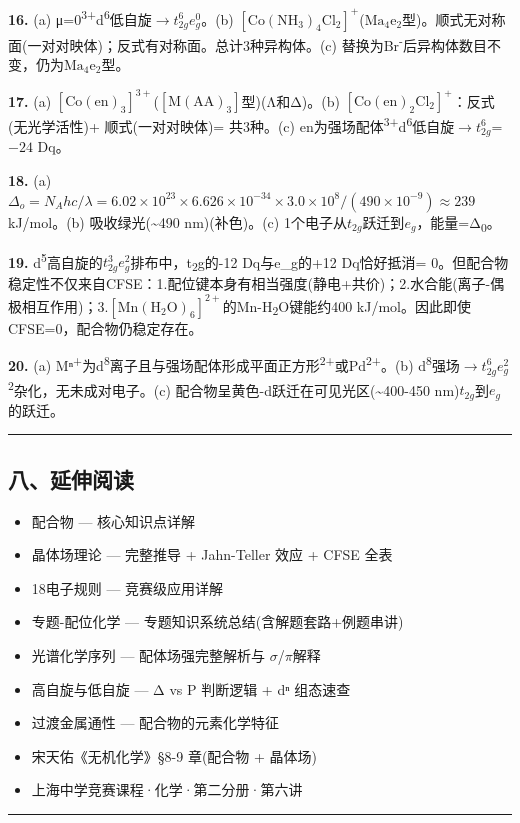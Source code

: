 \documentclass[a4paper,11pt]{ctexart}
\providecommand{\tightlist}{\setlength{\itemsep}{0pt}\setlength{\parskip}{0pt}}
\newcommand{\箭}{\ensuremath{\rightarrow}}
\newcommand{\左箭}{\ensuremath{\leftarrow}}
\newcommand{\上箭}{\ensuremath{\uparrow}}
\newcommand{\下箭}{\ensuremath{\downarrow}}
\newcommand{\衡}{\ensuremath{\rightleftharpoons}}
\newcommand{\双箭}{\ensuremath{\leftrightarrow}}
\newcommand{\约等于}{\ensuremath{\approx}}
\newcommand{\小于等于}{\ensuremath{\leq}}
\newcommand{\大于等于}{\ensuremath{\geq}}
\newcommand{\不等于}{\ensuremath{\neq}}
\newcommand{\西格马}{\ensuremath{\sigma}}
\newcommand{\派}{\ensuremath{\pi}}
\begin{document}
\textbf{16.} (a) μ=0\textsuperscript{3+}d\textsuperscript{6}低自旋\箭\(t_{2g}^6 e_g^0\)。(b) \(\mathrm{[Co(NH_3)_4Cl_2]^+}\)(\(\mathrm{Ma_4e_2}\)型)。顺式无对称面(一对对映体)；反式有对称面。总计3种异构体。(c) 替换为Br\textsuperscript{-}后异构体数目不变，仍为\(\mathrm{Ma_4e_2}\)型。

\textbf{17.} (a) \(\mathrm{[Co(en)_3]^{3+}}\)(\(\mathrm{[M(AA)_3]}\)型)(Λ和Δ)。(b) \(\mathrm{[Co(en)_2Cl_2]^+}\)：反式(无光学活性)+ 顺式(一对对映体)= 共3种。(c) en为强场配体\textsuperscript{3+}d\textsuperscript{6}低自旋\箭\(t_{2g}^6\) = \(-24\) Dq。

\textbf{18.} (a) \(\Delta_o = N_A hc/\lambda = 6.02 \times 10^{23} \times 6.626 \times 10^{-34} \times 3.0 \times 10^8 / (490 \times 10^{-9}) \approx 239\) kJ/mol。(b) 吸收绿光(\textasciitilde490 nm)(补色)。(c) 1个电子从\(t_{2g}\)跃迁到\(e_g\)，能量=Δ\textsubscript{0}。

\textbf{19.} d\textsuperscript{5}高自旋的\(t_{2g}^3 e_g^2\)排布中，t\textsubscript{2}g的-12 Dq与e\_g的+12 Dq恰好抵消 = 0。但配合物稳定性不仅来自CFSE：1.配位键本身有相当强度(静电+共价)；2.水合能(离子-偶极相互作用)；3.\(\mathrm{[Mn(H_2O)_6]^{2+}}\)的Mn-H\textsubscript{2}O键能约400 kJ/mol。因此即使CFSE=0，配合物仍稳定存在。

\textbf{20.} (a) Mⁿ\textsuperscript{+}为d\textsuperscript{8}离子且与强场配体形成平面正方形\textsuperscript{2+}或Pd\textsuperscript{2+}。(b) d\textsuperscript{8}强场\箭\(t_{2g}^6 e_g^2\)\textsuperscript{2}杂化，无未成对电子。(c) 配合物呈黄色-d跃迁在可见光区(\textasciitilde400-450 nm)\(t_{2g}\)到\(e_g\)的跃迁。

\begin{center}\rule{0.5\linewidth}{0.5pt}\end{center}

\subsection{八、延伸阅读}\label{ux516bux5ef6ux4f38ux9605ux8bfb}

\begin{itemize}
\tightlist
\item
  配合物 --- 核心知识点详解
\item
  晶体场理论 --- 完整推导 + Jahn-Teller 效应 + CFSE 全表
\item
  18电子规则 --- 竞赛级应用详解
\item
  专题-配位化学 --- 专题知识系统总结(含解题套路+例题串讲)
\item
  光谱化学序列 --- 配体场强完整解析与 \西格马/\派 解释
\item
  高自旋与低自旋 --- Δ vs P 判断逻辑 + dⁿ 组态速查
\item
  过渡金属通性 --- 配合物的元素化学特征
\item
  宋天佑《无机化学》§8-9 章(配合物 + 晶体场)
\item
  上海中学竞赛课程·化学·第二分册·第六讲
\end{itemize}

\begin{center}\rule{0.5\linewidth}{0.5pt}\end{center}
\end{document}
